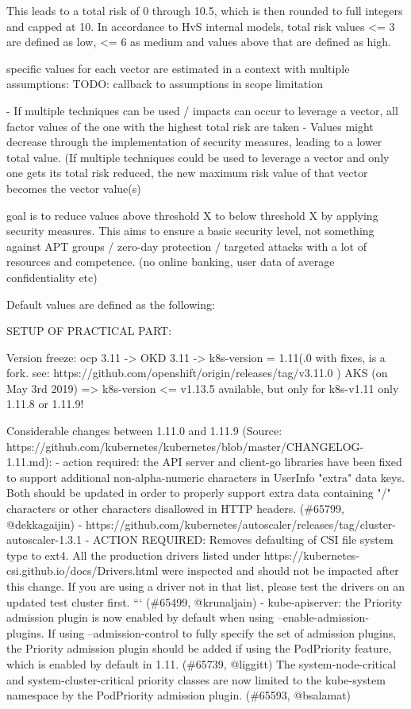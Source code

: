 This leads to a total risk of 0 through 10.5, which is then rounded to full integers and capped at 10. In accordance to HvS internal models, total risk values <= 3 are defined as low, <= 6 as medium and values above that are defined as high.

specific values for each vector are estimated in a context with multiple assumptions:
TODO: callback to assumptions in scope limitation

- If multiple techniques can be used / impacts can occur to leverage a vector, all factor values of the one with the highest total risk are taken
- Values might decrease through the implementation of security measures, leading to a lower total value. (If multiple techniques could be used to leverage a vector and only one gets its total risk reduced, the new maximum risk value of that vector becomes the vector value(s)

goal is to reduce values above threshold X to below threshold X by applying security measures. This aims to ensure a basic security level, not something against APT groups / zero-day protection / targeted attacks with a lot of resources and competence. (no online banking, user data of average confidentiality etc)

Default values are defined as the following:

SETUP OF PRACTICAL PART:

Version freeze:
\gls{ocp} 3.11 -> OKD 3.11 ->  k8s-version = 1.11(.0 with fixes, is a fork. see: https://github.com/openshift/origin/releases/tag/v3.11.0 )
AKS (on May 3rd 2019) => k8s-version <= v1.13.5 available, but only for k8s-v1.11 only 1.11.8 or 1.11.9!

Considerable changes between 1.11.0 and 1.11.9 (Source: https://github.com/kubernetes/kubernetes/blob/master/CHANGELOG-1.11.md):
- action required: the API server and client-go libraries have been fixed to support additional non-alpha-numeric characters in UserInfo "extra" data keys. Both should be updated in order to properly support extra data containing "/" characters or other characters disallowed in HTTP headers. (\#65799, @dekkagaijin)
- https://github.com/kubernetes/autoscaler/releases/tag/cluster-autoscaler-1.3.1
- ACTION REQUIRED: Removes defaulting of CSI file system type to ext4. All the production drivers listed under https://kubernetes-csi.github.io/docs/Drivers.html were inspected and should not be impacted after this change. If you are using a driver not in that list, please test the drivers on an updated test cluster first. ``` (\#65499, @krunaljain)
- kube-apiserver: the Priority admission plugin is now enabled by default when using --enable-admission-plugins. If using --admission-control to fully specify the set of admission plugins, the Priority admission plugin should be added if using the PodPriority feature, which is enabled by default in 1.11. (\#65739, @liggitt)
The system-node-critical and system-cluster-critical priority classes are now limited to the kube-system namespace by the PodPriority admission plugin. (\#65593, @bsalamat)

